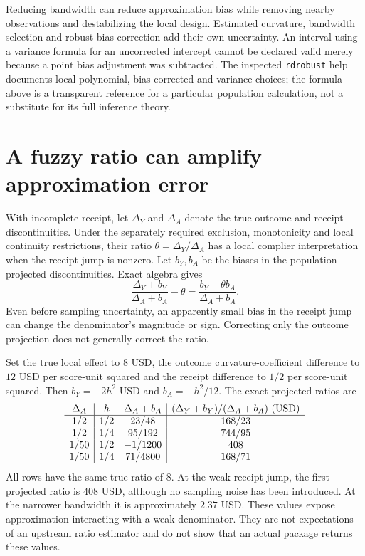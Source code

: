 Reducing bandwidth can reduce approximation bias while removing nearby
observations and destabilizing the local design. Estimated curvature,
bandwidth selection and robust bias correction add their own uncertainty.
An interval using a variance formula for an uncorrected intercept cannot be
declared valid merely because a point bias adjustment was subtracted. The
inspected \texttt{rdrobust} help documents local-polynomial, bias-corrected
and variance choices; the formula above is a transparent reference for a
particular population calculation, not a substitute for its full inference
theory.\citep{exec13_ivrd_rdrobust}

\section{A fuzzy ratio can amplify approximation error}
\label{exec17:s4-fuzzy}

With incomplete receipt, let $\Delta_Y$ and $\Delta_A$ denote the true
outcome and receipt discontinuities. Under the separately required exclusion,
monotonicity and local continuity restrictions, their ratio
$\theta=\Delta_Y/\Delta_A$ has a local complier interpretation when the
receipt jump is nonzero. Let $b_Y,b_A$ be the biases in the population
projected discontinuities. Exact algebra gives
\begin{equation}
 \frac{\Delta_Y+b_Y}{\Delta_A+b_A}-\theta
       =\frac{b_Y-\theta b_A}{\Delta_A+b_A}.
 \label{exec17:s4-fuzzy-bias}
\end{equation}
Even before sampling uncertainty, an apparently small bias in the receipt
jump can change the denominator's magnitude or sign. Correcting only the
outcome projection does not generally correct the ratio.

Set the true local effect to $8$ USD, the outcome curvature-coefficient
difference to $12$ USD per score-unit squared and the receipt difference to
$1/2$ per score-unit squared. Then $b_Y=-2h^2$ USD and $b_A=-h^2/12$.
The exact projected ratios are
\[
\begin{array}{c|cc|c}
 \Delta_A&h&\Delta_A+b_A&
    (\Delta_Y+b_Y)/(\Delta_A+b_A)\ ({\rm USD})\\ \hline
 1/2&1/2&23/48&168/23\\
 1/2&1/4&95/192&744/95\\
 1/50&1/2&-1/1200&408\\
 1/50&1/4&71/4800&168/71
\end{array}
\]
All rows have the same true ratio of $8$. At the weak receipt jump, the
first projected ratio is $408$ USD, although no sampling noise has been
introduced. At the narrower bandwidth it is approximately $2.37$ USD.
These values expose approximation interacting with a weak denominator.
They are not expectations of an upstream ratio estimator and do not show
that an actual package returns these values.\citep{exec17_s4_math}

